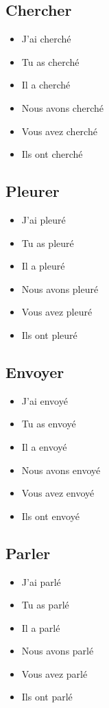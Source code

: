 \subsection{Chercher}

\begin{itemize}
    \item J'ai cherché
    \item Tu as cherché 
    \item Il a cherché 
    \item Nous avons cherché
    \item Vous avez cherché 
    \item Ils ont cherché
\end{itemize}

\subsection{Pleurer}

\begin{itemize}
    \item J'ai pleuré
    \item Tu as pleuré 
    \item Il a pleuré 
    \item Nous avons pleuré 
    \item Vous avez pleuré 
    \item Ils ont pleuré
\end{itemize}

\subsection{Envoyer}

\begin{itemize}
    \item J'ai envoyé
    \item Tu as envoyé
    \item Il a envoyé 
    \item Nous avons envoyé 
    \item Vous avez envoyé 
    \item Ils ont envoyé 
\end{itemize}

\subsection{Parler}

\begin{itemize}
    \item J'ai parlé
    \item Tu as parlé 
    \item Il a parlé 
    \item Nous avons parlé 
    \item Vous avez parlé 
    \item Ils ont parlé
\end{itemize}

